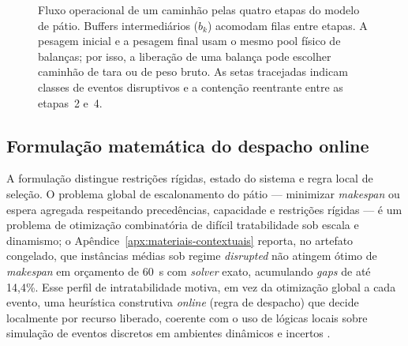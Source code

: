 \documentclass[
  12pt,
  oneside,
  a4paper,
  sumario=tradicional,
  brazil
]{abntex2}
\begin{document}
\begin{figure}[H]
{\begin{tikzpicture}
\end{tikzpicture}%
}%
\caption[Fluxo operacional do caminh\~ao]{Fluxo operacional de um caminh\~ao pelas quatro etapas do modelo de p\'atio. Buffers intermedi\'arios ($b_k$) acomodam filas entre etapas. A pesagem inicial e a pesagem final usam o mesmo pool f\'isico de balan\c{c}as; por isso, a libera\c{c}\~ao de uma balan\c{c}a pode escolher caminh\~ao de tara ou de peso bruto. As setas tracejadas indicam classes de eventos disruptivos e a conten\c{c}\~ao reentrante entre as etapas~2 e~4.}
\label{fig:fluxo-operacional}
\end{figure}

\subsection{Formula\c{c}\~ao matem\'atica do despacho online}
\label{sec:formulacao-despacho}

A formula\c{c}\~ao distingue restri\c{c}\~oes r\'igidas, estado do sistema e regra local de sele\c{c}\~ao. O problema global de escalonamento do p\'atio --- minimizar \textit{makespan} ou espera agregada respeitando preced\^encias, capacidade e restri\c{c}\~oes r\'igidas --- \'e um problema de otimiza\c{c}\~ao combinat\'oria de dif\'icil tratabilidade sob escala e dinamismo; o Ap\^endice~\ref{apx:materiais-contextuais} reporta, no artefato congelado, que inst\^ancias m\'edias sob regime \textit{disrupted} n\~ao atingem \'otimo de \textit{makespan} em or\c{c}amento de 60~s com \textit{solver} exato, acumulando \textit{gaps} de at\'e 14{,}4\%. Esse perfil de intratabilidade motiva, em vez da otimiza\c{c}\~ao global a cada evento, uma heur\'istica construtiva \textit{online} (regra de despacho) que decide localmente por recurso liberado, coerente com o uso de l\'ogicas locais sobre simula\c{c}\~ao de eventos discretos em ambientes din\^amicos e incertos \parencite{torbaliMultiagentbasedRealtimeTruck2023,fonsecaStabilityApproachCDC2025}.
\end{document}
